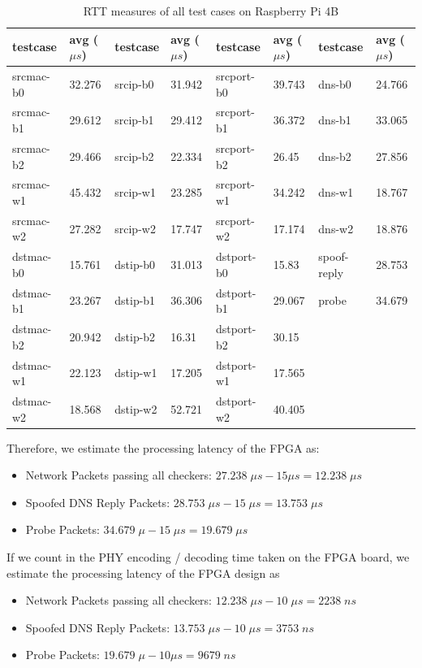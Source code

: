 \documentclass[a4paper]{report}
\begin{document}
\begin{table}[h!]
\begin{tabular}{ll|ll|ll|ll}
\hline
testcase  & avg ($\mu s$) & testcase & avg ($\mu s$) & testcase   & avg ($\mu s$) & testcase  & avg ($\mu s$) \\ \hline
srcmac-b0 & 32.276   & srcip-b0 & 31.942   & srcport-b0 & 39.743   & dns-b0      & 24.766   \\
srcmac-b1 & 29.612   & srcip-b1 & 29.412   & srcport-b1 & 36.372   & dns-b1      & 33.065   \\
srcmac-b2 & 29.466   & srcip-b2 & 22.334   & srcport-b2 & 26.45    & dns-b2      & 27.856   \\
srcmac-w1 & 45.432   & srcip-w1 & 23.285   & srcport-w1 & 34.242   & dns-w1      & 18.767   \\
srcmac-w2 & 27.282   & srcip-w2 & 17.747   & srcport-w2 & 17.174   & dns-w2      & 18.876   \\
dstmac-b0 & 15.761   & dstip-b0 & 31.013   & dstport-b0 & 15.83    & spoof-reply & 28.753   \\
dstmac-b1 & 23.267   & dstip-b1 & 36.306   & dstport-b1 & 29.067   & probe       & 34.679   \\
dstmac-b2 & 20.942   & dstip-b2 & 16.31    & dstport-b2 & 30.15    &             &          \\
dstmac-w1 & 22.123   & dstip-w1 & 17.205   & dstport-w1 & 17.565   &             &          \\
dstmac-w2 & 18.568   & dstip-w2 & 52.721   & dstport-w2 & 40.405   &             &          \\ \hline
\end{tabular}
\caption{RTT measures of all test cases on Raspberry Pi 4B}
\label{table:performance-test}
\end{table}
Therefore, we estimate the processing latency of the FPGA as:
\begin{itemize}[noitemsep]
    \item Network Packets passing all checkers: $27.238\; \mu s - 15\mu s = 12.238\; \mu s$
    \item Spoofed DNS Reply Packets: $28.753\; \mu s - 15\; \mu s = 13.753\; \mu s$
    \item Probe Packets: $34.679\; \mu - 15\; \mu s = 19.679\; \mu s$
\end{itemize}
If we count in the PHY encoding / decoding time taken on the FPGA board, we estimate the processing latency of the FPGA design as 
\begin{itemize}[noitemsep]
    \item Network Packets passing all checkers: $12.238\; \mu s - 10\; \mu s= 2238\; ns$
    \item Spoofed DNS Reply Packets: $13.753\; \mu s - 10\; \mu s = 3753\; ns$
    \item Probe Packets: $19.679\; \mu - 10 \mu s = 9679\; ns$
\end{itemize}
\end{document}

